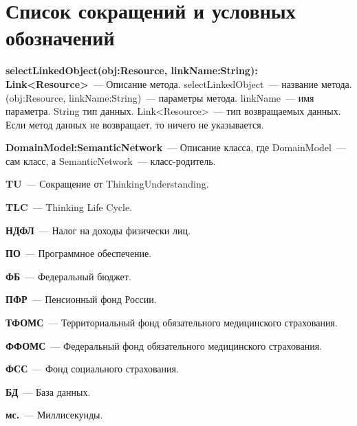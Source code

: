 \chapter*{Список сокращений и условных обозначений} \label{acronyms}             %

\textbf{selectLinkedObject(obj:Resource, linkName:String): Link<Resource>}~--- Описание метода. selectLinkedObject~--- название метода. (obj:Resource, linkName:String)~--- параметры метода. linkName~--- имя параметра. String тип данных. Link<Resource>~--- тип возвращаемых данных. Если метод данных не возвращает, то ничего не указывается.\par
\textbf{DomainModel:SemanticNetwork}~--- Описание класса, где DomainModel~--- сам класс, а SemanticNetwork~--- класс-родитель.\par
\textbf{TU}~--- Сокращение от ThinkingUnderstanding.\par
\textbf{TLC}~--- Thinking Life Cycle.\par
\textbf{НДФЛ}~--- Налог на доходы физически лиц.\par
\textbf{ПО}~--- Программное обеспечение.\par
\textbf{ФБ}~--- Федеральный бюджет.\par
\textbf{ПФР}~--- Пенсионный фонд России.\par
\textbf{ТФОМС}~--- Территориальный фонд обязательного медицинского страхования.\par
\textbf{ФФОМС}~--- Федеральный фонд обязательного медицинского страхования.\par
\textbf{ФСС}~--- Фонд социального страхования.\par
\textbf{БД}~--- База данных.\par
\textbf{мс.}~--- Миллисекунды.\par


\clearpage

